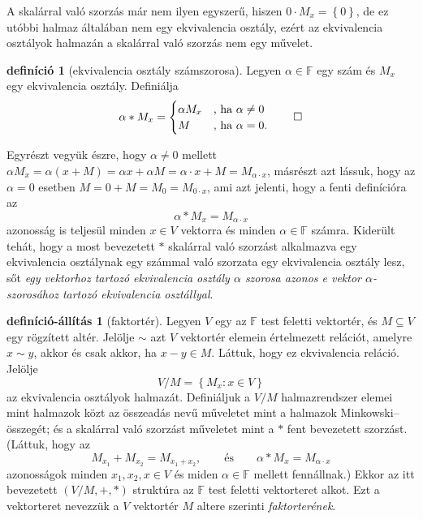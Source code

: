 \documentclass[a4paper, showtrims]{memoir}
\theoremstyle{plain}
\theoremstyle{remark}
\theoremstyle{definition}
\newtheorem{definition}[proposition]{definíció}
\newtheorem{defprop}[proposition]{definíció-állítás}
\begin{document}
A skalárral való szorzás már nem ilyen egyszerű,
hiszen $0\cdot M_x=\left\{ 0 \right\}$, de ez utóbbi halmaz általában nem egy ekvivalencia osztály,
ezért az ekvivalencia osztályok halmazán a skalárral való szorzás nem egy művelet.
\begin{definition}[ekvivalencia osztály számszorosa]
	Legyen $\alpha\in\mathbb{F}$ egy szám és $M_{x}$ egy ekvivalencia osztály.
    Definiálja
	\[
		\alpha\ast M_x=
		\begin{cases}
			\alpha M_x & \text{, ha }\alpha\neq 0 \\
			M          & \text{, ha }\alpha=0.
		\end{cases}\qedhere
	\]
\end{definition}
Egyrészt vegyük észre,
hogy $\alpha\neq 0$ mellett
$\alpha M_x=\alpha\left( x+M \right)=\alpha x+\alpha M=\alpha\cdot x+M=M_{\alpha\cdot x}$,
másrészt azt lássuk,
hogy az $\alpha=0$ esetben
$M=0+M=M_0=M_{0\cdot x}$, ami azt jelenti, hogy a fenti definícióra az
\[
	\alpha\ast M_x=M_{\alpha\cdot x}\tag{\ddag}
\]
azonosság is teljesül minden $x\in V$ vektorra és minden $\alpha\in\mathbb{F}$ számra.
Kiderült tehát, hogy a most bevezetett $\ast$ skalárral való szorzást alkalmazva
egy ekvivalencia osztálynak egy számmal való szorzata egy ekvivalencia osztály lesz,
sőt
\emph{egy vektorhoz tartozó ekvivalencia osztály $\alpha$ szorosa azonos e vektor $\alpha$-szorosához tartozó
	ekvivalencia osztállyal}.
\begin{defprop}[faktortér]
	Legyen $V$ egy az $\mathbb{F}$ test feletti vektortér,
	és $M\subseteq V$ egy rögzített altér.
	Jelölje $\sim$ azt $V$ vektortér elemein értelmezett relációt,
	amelyre $x\sim y$, akkor és csak akkor, ha $x-y\in M$.
	Láttuk, hogy ez ekvivalencia reláció.
	Jelölje
	\[
		V/M=\left\{ M_x:x\in V \right\}
	\]
	az ekvivalencia osztályok halmazát.
	Definiáljuk a $V/M$ halmazrendszer elemei mint halmazok közt az összeadás nevű műveletet mint a halmazok 
	Minkowski--összegét;
    és a skalárral való szorzást műveletet mint a $\ast$ fent bevezetett szorzást.
    (Láttuk, hogy az
	\[
		M_{x_1}+M_{x_2}=M_{x_1+x_2},
		\qquad
		\text{és}
		\qquad
		\alpha\ast M_x=M_{\alpha\cdot x}
	\]
    azonosságok minden $x_1,x_2,x\in V$ és miden $\alpha\in\mathbb{F}$ mellett fennállnak.)
	Ekkor az itt bevezetett $(V/M,+,\ast)$ struktúra az $\mathbb{F}$ test feletti vektorteret alkot.
	Ezt a vektorteret nevezzük a $V$ vektortér $M$ altere szerinti \emph{faktorterének}.
\end{defprop}
\end{document}
